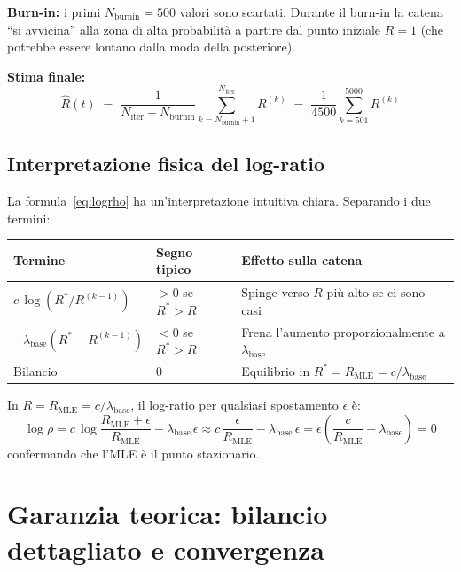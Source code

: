 \documentclass[12pt,a4paper]{article}
\newcommand{\lbase}{\lambda_{\mathrm{base}}}
\begin{document}
\textbf{Burn-in:} i primi $N_{\mathrm{burnin}} = 500$ valori sono scartati.
Durante il burn-in la catena ``si avvicina'' alla zona di alta probabilità a partire
dal punto iniziale $R=1$ (che potrebbe essere lontano dalla moda della posteriore).

\textbf{Stima finale:}
\begin{equation}
  \widehat{R}(t) \;=\; \frac{1}{N_{\mathrm{iter}} - N_{\mathrm{burnin}}} \sum_{k=N_{\mathrm{burnin}}+1}^{N_{\mathrm{iter}}} R^{(k)}
  \;=\; \frac{1}{4500} \sum_{k=501}^{5000} R^{(k)}
  \label{eq:stima}
\end{equation}

\subsection{Interpretazione fisica del log-ratio}

La formula~\eqref{eq:logrho} ha un'interpretazione intuitiva chiara. Separando i due termini:

\begin{center}
\renewcommand{\arraystretch}{1.5}
\begin{tabular}{lll}
\toprule
Termine & Segno tipico & Effetto sulla catena \\
\midrule
$c\,\log(R^*/R^{(k-1)})$ & $> 0$ se $R^* > R$ & Spinge verso $R$ più alto se ci sono casi \\
$-\lbase(R^* - R^{(k-1)})$ & $< 0$ se $R^* > R$ & Frena l'aumento proporzionalmente a $\lbase$ \\
\midrule
Bilancio & 0 & Equilibrio in $R^* = R_{\mathrm{MLE}} = c/\lbase$ \\
\bottomrule
\end{tabular}
\end{center}

In $R = R_{\mathrm{MLE}} = c/\lbase$, il log-ratio per qualsiasi spostamento $\epsilon$ è:
\begin{equation}
  \log\rho = c\,\log\!\frac{R_{\mathrm{MLE}}+\epsilon}{R_{\mathrm{MLE}}} - \lbase\,\epsilon
  \approx c\,\frac{\epsilon}{R_{\mathrm{MLE}}} - \lbase\,\epsilon
  = \epsilon\!\left(\frac{c}{R_{\mathrm{MLE}}} - \lbase\right) = 0
\end{equation}
confermando che l'MLE è il punto stazionario.

\section{Garanzia teorica: bilancio dettagliato e convergenza}
\end{document}
